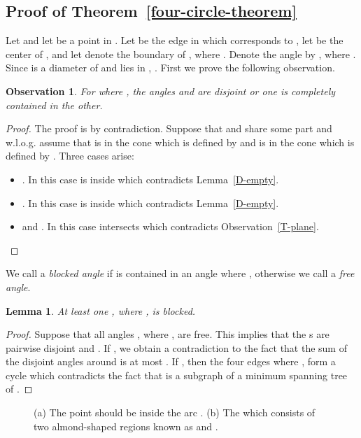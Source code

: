 \documentclass[11pt,a4paper]{article}
\newtheorem{lemma}{Lemma}
\newtheorem{observation}{Observation}
\begin{document}
\subsection{Proof of Theorem~\ref{four-circle-theorem}}
\label{proof-section}
Let   and let  be a point in . Let  be the edge in  which corresponds to , let  be the center of , and let  denote the boundary of , where . Denote the angle  by , where . Since  is a diameter of  and  lies in , . First we prove the following observation.
\begin{observation}
\label{inclusion-exclusion}
 For  where , the angles  and  are disjoint or one is completely contained in the other.
\end{observation}
\begin{proof}
The proof is by contradiction. Suppose that  and  share some part and w.l.o.g. assume that  is in the cone which is defined by  and  is in the cone which is defined by . Three cases arise:
\begin{itemize}
 \item . In this case  is inside  which contradicts Lemma~\ref{D-empty}.
 \item . In this case  is inside  which contradicts Lemma~\ref{D-empty}.
 \item  and . In this case  intersects  which contradicts Observation~\ref{T-plane}.
\end{itemize}
\end{proof}

We call  a {\em blocked angle} if  is contained in an angle  where , otherwise we call  a {\em free angle}.

\begin{lemma}
\label{not-all-free-angles}
At least one , where , is blocked.
\end{lemma}
\begin{proof}
Suppose that all angles , where , are free. This implies that the s are pairwise disjoint and . If , we obtain a contradiction to the fact that the sum of the disjoint angles around  is at most . If , then the four edges  where , form a cycle which contradicts the fact that  is a subgraph of a minimum spanning tree of .
\end{proof}

\begin{figure}[htb]
  \centering
\setlength{\tabcolsep}{0in}
  
  \caption{(a) The point  should be inside the arc . (b) The  which consists of two almond-shaped regions known as  and .}
\label{trap-fig}
\end{figure}
\end{document}
